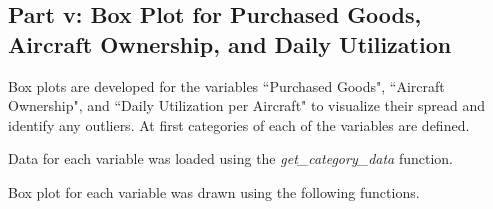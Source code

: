 \subsection{Part v: Box Plot for Purchased Goods, Aircraft Ownership, and Daily Utilization}
Box plots are developed for the variables ``Purchased Goods", ``Aircraft Ownership", and ``Daily Utilization per Aircraft" to visualize their spread and identify any outliers. At first categories of each of the variables are defined.


Data for each variable was loaded using the \textit{get\_category\_data} function.



Box plot for each variable was drawn using the following functions.



